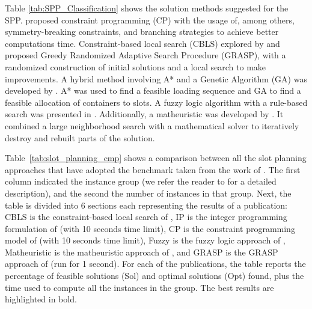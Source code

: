 \documentclass[preprint,12pt,authoryear]{elsarticle}
\begin{document}
Table \ref{tab:SPP_Classification} shows the solution methods suggested for the SPP. \cite{Delgado2009, Delgado2012ABays} proposed constraint programming (CP) with the usage of, among others, symmetry-breaking constraints, and branching strategies to achieve better computations time. Constraint-based local search (CBLS) explored by \cite{Pacino2010ABays} and \cite{Parreno2016AProblem} proposed Greedy Randomized Adaptive Search Procedure (GRASP), with a randomized construction of initial solutions and a local search to make improvements. A hybrid method involving A* and a Genetic Algorithm (GA) was developed by \cite{Yifan2016Group-BayShip}. A* was used to find a feasible loading sequence and GA to find a feasible allocation of containers to slots. A fuzzy logic algorithm with a rule-based search was presented in \cite{Rashed2021AVessels}. Additionally, a matheuristic was developed by \cite{Korach2020MatheuristicsBays}. It combined a large neighborhood search with a mathematical solver to iteratively destroy and rebuilt parts of the solution.

Table~\ref{tab:slot_planning_cmp} shows a comparison between all the slot planning approaches that have adopted the benchmark taken from the work of  \cite{Delgado2009}. The first column indicated the instance group (we refer the reader to \cite{Delgado2012ABays} for a detailed description), and the second the number of instances in that group. Next, the table is divided into 6 sections each representing the results of a publication: CBLS is the constraint-based local search of \cite{Pacino2013FastSearch}, IP is the integer programming formulation of \cite{Delgado2012ABays} (with 10 seconds time limit), CP is the constraint programming model of \cite{Delgado2009} (with 10 seconds time limit), Fuzzy is the fuzzy logic approach of \cite{Rashed2021AVessels}, Matheuristic is the matheuristic approach of \cite{Korach2020MatheuristicsBays}, and GRASP is the GRASP approach of \cite{Parreno2016AProblem} (run for 1 second). For each of the publications, the table reports the percentage of feasible solutions (Sol) and optimal solutions (Opt) found, plus the time used to compute all the instances in the group. The best results are highlighted in bold.
\end{document}
